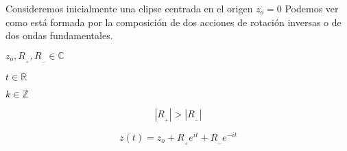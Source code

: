 \documentclass[preview]{standalone}
\begin{document}
\begin{center}
Consideremos inicialmente una elipse centrada en el origen $z_o=0$ 
Podemos ver como  está formada por la composición  de dos acciones 
de rotación inversas o de dos ondas fundamentales.

$z_o , R_{_+} , R_{_-} \in \mathbb{C}$  

$t \in \mathbb{R}$    

$k \in \mathbb{Z}$

$$|R_{_+}|>|R_{_-}|$$  

$$z(t)=z_o+ R_{_+} e^{it} +R_{_-} e^{-it}$$
\end{center}
\end{document}
